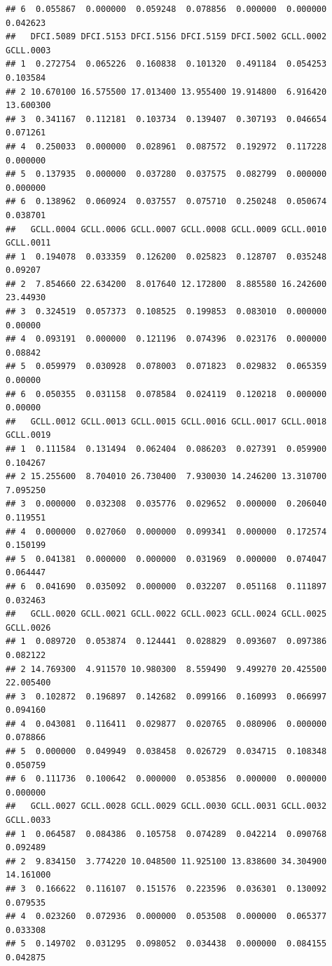 \documentclass[
]{article}
\begin{document}
\begin{verbatim}
## 6  0.055867  0.000000  0.059248  0.078856  0.000000  0.000000  0.042623
##   DFCI.5089 DFCI.5153 DFCI.5156 DFCI.5159 DFCI.5002 GCLL.0002 GCLL.0003
## 1  0.272754  0.065226  0.160838  0.101320  0.491184  0.054253  0.103584
## 2 10.670100 16.575500 17.013400 13.955400 19.914800  6.916420 13.600300
## 3  0.341167  0.112181  0.103734  0.139407  0.307193  0.046654  0.071261
## 4  0.250033  0.000000  0.028961  0.087572  0.192972  0.117228  0.000000
## 5  0.137935  0.000000  0.037280  0.037575  0.082799  0.000000  0.000000
## 6  0.138962  0.060924  0.037557  0.075710  0.250248  0.050674  0.038701
##   GCLL.0004 GCLL.0006 GCLL.0007 GCLL.0008 GCLL.0009 GCLL.0010 GCLL.0011
## 1  0.194078  0.033359  0.126200  0.025823  0.128707  0.035248   0.09207
## 2  7.854660 22.634200  8.017640 12.172800  8.885580 16.242600  23.44930
## 3  0.324519  0.057373  0.108525  0.199853  0.083010  0.000000   0.00000
## 4  0.093191  0.000000  0.121196  0.074396  0.023176  0.000000   0.08842
## 5  0.059979  0.030928  0.078003  0.071823  0.029832  0.065359   0.00000
## 6  0.050355  0.031158  0.078584  0.024119  0.120218  0.000000   0.00000
##   GCLL.0012 GCLL.0013 GCLL.0015 GCLL.0016 GCLL.0017 GCLL.0018 GCLL.0019
## 1  0.111584  0.131494  0.062404  0.086203  0.027391  0.059900  0.104267
## 2 15.255600  8.704010 26.730400  7.930030 14.246200 13.310700  7.095250
## 3  0.000000  0.032308  0.035776  0.029652  0.000000  0.206040  0.119551
## 4  0.000000  0.027060  0.000000  0.099341  0.000000  0.172574  0.150199
## 5  0.041381  0.000000  0.000000  0.031969  0.000000  0.074047  0.064447
## 6  0.041690  0.035092  0.000000  0.032207  0.051168  0.111897  0.032463
##   GCLL.0020 GCLL.0021 GCLL.0022 GCLL.0023 GCLL.0024 GCLL.0025 GCLL.0026
## 1  0.089720  0.053874  0.124441  0.028829  0.093607  0.097386  0.082122
## 2 14.769300  4.911570 10.980300  8.559490  9.499270 20.425500 22.005400
## 3  0.102872  0.196897  0.142682  0.099166  0.160993  0.066997  0.094160
## 4  0.043081  0.116411  0.029877  0.020765  0.080906  0.000000  0.078866
## 5  0.000000  0.049949  0.038458  0.026729  0.034715  0.108348  0.050759
## 6  0.111736  0.100642  0.000000  0.053856  0.000000  0.000000  0.000000
##   GCLL.0027 GCLL.0028 GCLL.0029 GCLL.0030 GCLL.0031 GCLL.0032 GCLL.0033
## 1  0.064587  0.084386  0.105758  0.074289  0.042214  0.090768  0.092489
## 2  9.834150  3.774220 10.048500 11.925100 13.838600 34.304900 14.161000
## 3  0.166622  0.116107  0.151576  0.223596  0.036301  0.130092  0.079535
## 4  0.023260  0.072936  0.000000  0.053508  0.000000  0.065377  0.033308
## 5  0.149702  0.031295  0.098052  0.034438  0.000000  0.084155  0.042875

\end{verbatim}
\end{document}
